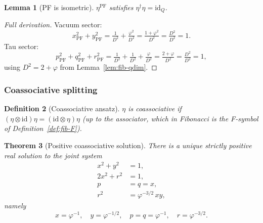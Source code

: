 \documentclass[11pt,a4paper]{article}
\newtheorem{definition}{Definition}[section]
\newtheorem{lemma}[definition]{Lemma}
\newtheorem{theorem}[definition]{Theorem}
\theoremstyle{definition}
\newcommand{\id}{\mathrm{id}}
\begin{document}
\begin{lemma}[PF is isometric]\label{lem:PF-isom}
$\eta^{\mathrm{PF}}$ satisfies $\eta^\dagger\eta = \id_Q$.
\end{lemma}

\begin{proof}[Full derivation]
Vacuum sector:
\[
x_{\mathrm{PF}}^{2}+y_{\mathrm{PF}}^{2}
= \tfrac{1}{D^{2}}+\tfrac{\varphi^{2}}{D^{2}}
= \tfrac{1+\varphi^{2}}{D^{2}}
= \tfrac{D^{2}}{D^{2}}
= 1.
\]
Tau sector:
\[
p_{\mathrm{PF}}^{2}+q_{\mathrm{PF}}^{2}+r_{\mathrm{PF}}^{2}
= \tfrac{1}{D^{2}}+\tfrac{1}{D^{2}}+\tfrac{\varphi}{D^{2}}
= \tfrac{2+\varphi}{D^{2}}
= \tfrac{D^{2}}{D^{2}}
= 1,
\]
using $D^{2}=2+\varphi$ from Lemma~\ref{lem:fib-qdim}.
\end{proof}

\subsubsection{Coassociative splitting}

\begin{definition}[Coassociative ansatz]\label{def:coassoc}
$\eta$ is \emph{coassociative} if $(\eta\otimes\id)\eta = (\id\otimes\eta)\eta$
(up to the associator, which in Fibonacci is the F-symbol of
Definition~\ref{def:fib-F}).
\end{definition}

\begin{theorem}[Positive coassociative solution]\label{thm:coassoc}
There is a unique strictly positive real solution to the joint system
\begin{align*}
x^{2}+y^{2} &= 1, \tag{N1}\\
2x^{2}+r^{2} &= 1, \tag{N2}\\
p &= q = x, \tag{C1}\\
r^{2} &= \varphi^{-3/2}\,xy, \tag{C2}
\end{align*}
namely
\[
x = \varphi^{-1},\quad
y = \varphi^{-1/2},\quad
p = q = \varphi^{-1},\quad
r = \varphi^{-3/2}.
\]
\end{theorem}
\end{document}
